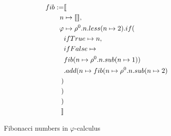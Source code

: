 \begin{figure}
    \begin{align*}
        fib := &\llbracket                                     \\
            n &\mapsto \llbracket  \rrbracket,                           \\
            \varphi &\mapsto \rho^0.n.less(n \mapsto 2).if( \\
            &ifTrue \mapsto n,                                \\
            &ifFalse \mapsto                                  \\
            &fib(n \mapsto \rho^0.n.sub(n \mapsto 1))\\
            &.add(n \mapsto fib(n \mapsto \rho^0.n.sub(n \mapsto2)\\)\\)\\)\\
         \rrbracket
    \end{align*}
    \caption{Fibonacci numbers in $\varphi$-calculus}
    \label{fig:fibo}
\end{figure}